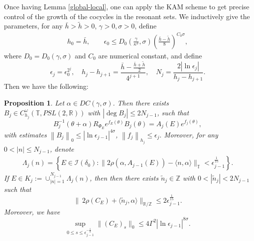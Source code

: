 \documentclass[11pt]{amsart}
\newtheorem{proposition}[theorem]{Proposition}
\theoremstyle{remark}
\theoremstyle{definition}
\newcommand{\T}{{\mathbf T}}
\def\T{{\mathbb T}}
\begin{document}
Once having Lemma \ref{global-local}, one can apply the KAM scheme to get precise control of the growth of the cocycles in the resonant sets.  We inductively give the parameters, 
for any $\bar{h}>\tilde{h}>0$, $\gamma>0,\sigma>0$, define 
\begin{align*}
 h_0=\bar{h}, \qquad  \epsilon_0 \leq D_0(\frac{\gamma}{\kappa^{\sigma}},\sigma) (\frac{\bar{h}-\tilde{h}}{8})^{C_0\sigma},\end{align*}
 where $D_{0} = D_0(\gamma,\sigma)$ and $C_{0}$ are numerical constant,  and define
$$
\epsilon_j= \epsilon_0^{2^j}, \quad h_j-h_{j+1}=\frac{\bar{h}-\frac{\bar{h}+\tilde{h}}{2}}{4^{j+1}}, \quad N_j=\frac{2|\ln\epsilon_j|}{h_j-h_{j+1}}.
$$
Then we have the following:
\begin{proposition}\label{local kam}\cite{LYZZ, WXYZZ}
Let $\alpha\in DC( \gamma, \sigma)$. Then there exists $B_{j} \in C_{h_{j}}^{\omega}\left(\mathbb{T}, PSL(2, \mathbb{R})\right)$ with
$|\deg B_j |  \leq 2 N_{j-1}$,
such that
$$B_{j}^{-1}(\theta+ \alpha) R_{\Phi_{E}}e^{f_{E}(\theta)} B_{j}(\theta)=A_{j}(E) e^{f_{j}(\theta)},$$
with  estimates  $
\left\|B_{j}\right\|_{0} \leq |\ln\epsilon_{j-1}|^{4\sigma}$, $\left\|f_{j}\right\|_{h_{j}} \leq \epsilon_{j}.$ 
Moreover,  for any $0<|n| \leq N_{j-1}$, denote 
\begin{equation*}
\begin{split}
\Lambda_{j}(n)=\left\{E\in \mathcal{I}(\delta_0):\|2 \rho(\alpha, A_{j-1}(E))- \langle n, \alpha \rangle\|_{\T}< \epsilon_{j-1}^{\frac{1}{15}}\right\}.
\end{split}
\end{equation*}
If 
 $E\in K_j:= \cup_{|n|=1}^{N_{j-1}}\Lambda_{j}(n)$, then then there exists $\tilde{n}_j \in \mathbb{Z}$ with $0<|\tilde{n}_j| <2N_{j-1}$ such that
\begin{equation*}
\| \ 2\rho(C_E)+\langle \tilde{n}_j, \alpha\rangle\|_{\mathbb{R} / \mathbb{Z}} \leqslant 2 \epsilon_{j-1}^{\frac{1}{15}}.
\end{equation*}
Moreover,  we have 
\begin{equation*}
\sup _{0 \leq s \leq \epsilon_{j-1}^{-\frac{1}{8}}}\|(C_{E})_s\|_{0} \leq 4\Gamma^2 |\ln\epsilon_{j-1}|^{8\sigma}.
\end{equation*}
\end{proposition}
\end{document}

